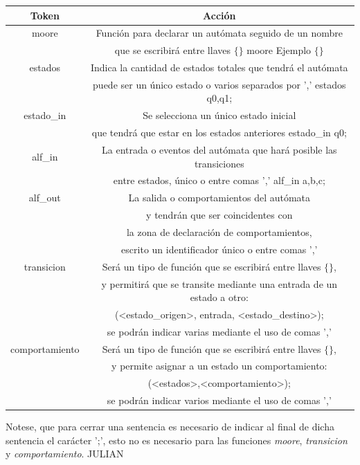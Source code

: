 \documentclass[12pt,a4paper]{article}
\begin{document}
\begin{center}
\begin{tabular}{|c|c|}
	\hline 
	\textbf{Token} & \textbf{Acción} \\ 
	\hline 
	moore & Función para declarar un autómata seguido de un nombre   \\
	& que se escribirá entre llaves $\{\}$ moore Ejemplo $\{\}$\\
	\hline 
	estados & Indica la cantidad de estados totales que tendrá el autómata  \\
	& puede ser un único estado o varios separados por ',' estados q0,q1;\\ 
	\hline 
	estado\_in & Se selecciona un único estado inicial  \\ 
	& que tendrá que estar en los estados anteriores estado\_in q0; \\
	\hline 
	alf\_in & La entrada o eventos del autómata que hará posible las transiciones\\
	& entre estados, único o entre comas ',' alf\_in a,b,c;\\
	\hline 
	alf\_out &  La salida o comportamientos del autómata  \\
	& y tendrán que ser coincidentes con \\ 
	& la zona de declaración de comportamientos, \\
	&  escrito un identificador único o entre comas ',' \\
	\hline
	transicion & Será un tipo de función que se escribirá entre llaves $\{\}$, \\
	& y permitirá que se transite mediante una entrada de un estado a otro: \\ 
	& (<estado\_origen>, entrada, <estado\_destino>); \\
	& se podrán indicar varias mediante el uso de comas ',' \\
	\hline 
	comportamiento & Será un tipo de función que se escribirá entre llaves $\{\}$,   \\ 
	& y permite asignar a un estado un comportamiento: \\
	& (<estados>,<comportamiento>); \\
	& se podrán indicar varios mediante el uso de comas ','\\
	\hline  
\end{tabular} 
\end{center}
Notese, que para cerrar una sentencia es necesario de indicar al final de dicha sentencia el carácter ';', esto no es necesario para las funciones \textit{moore}, \textit{transicion} y \textit{comportamiento}.
JULIAN
\end{document}
